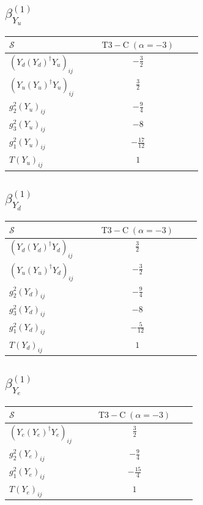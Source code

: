 \documentclass[9pt]{article}
\begin{document}
\subsection*{$ \beta_{Y_u}^{(1)} $}
\begin{longtable}{@{}p{0.38\linewidth}c@{}}
\toprule
$\mathcal{S}$ & $ \mathrm{T3-C}\;(\alpha=-3) $ \\
\midrule
$ (Y_d (Y_d)^{\dagger} Y_u)_{ij} $ & $ - \frac{3}{2} $ \\
$ (Y_u (Y_u)^{\dagger} Y_u)_{ij} $ & $ \frac{3}{2} $ \\
$ g_2^2 (Y_u)_{ij} $ & $ - \frac{9}{4} $ \\
$ g_3^2 (Y_u)_{ij} $ & $ -8 $ \\
$ g_1^2 (Y_u)_{ij} $ & $ - \frac{17}{12} $ \\
$ T (Y_u)_{ij} $ & $ 1 $ \\
\bottomrule
\end{longtable}
\subsection*{$ \beta_{Y_d}^{(1)} $}
\begin{longtable}{@{}p{0.38\linewidth}c@{}}
\toprule
$\mathcal{S}$ & $ \mathrm{T3-C}\;(\alpha=-3) $ \\
\midrule
$ (Y_d (Y_d)^{\dagger} Y_d)_{ij} $ & $ \frac{3}{2} $ \\
$ (Y_u (Y_u)^{\dagger} Y_d)_{ij} $ & $ - \frac{3}{2} $ \\
$ g_2^2 (Y_d)_{ij} $ & $ - \frac{9}{4} $ \\
$ g_3^2 (Y_d)_{ij} $ & $ -8 $ \\
$ g_1^2 (Y_d)_{ij} $ & $ - \frac{5}{12} $ \\
$ T (Y_d)_{ij} $ & $ 1 $ \\
\bottomrule
\end{longtable}
\subsection*{$ \beta_{Y_e}^{(1)} $}
\begin{longtable}{@{}p{0.38\linewidth}c@{}}
\toprule
$\mathcal{S}$ & $ \mathrm{T3-C}\;(\alpha=-3) $ \\
\midrule
$ (Y_e (Y_e)^{\dagger} Y_e)_{ij} $ & $ \frac{3}{2} $ \\
$ g_2^2 (Y_e)_{ij} $ & $ - \frac{9}{4} $ \\
$ g_1^2 (Y_e)_{ij} $ & $ - \frac{15}{4} $ \\
$ T (Y_e)_{ij} $ & $ 1 $ \\
\bottomrule
\end{longtable}
\end{document}
